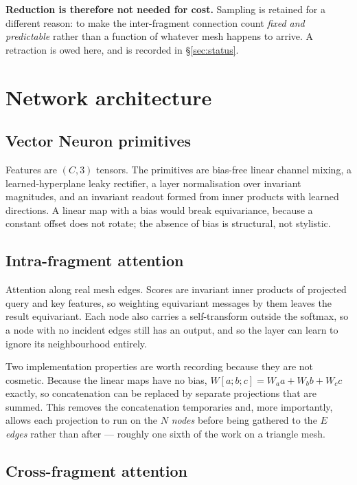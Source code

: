\documentclass[11pt,a4paper]{report}
\begin{document}
\textbf{Reduction is therefore not needed for cost.} Sampling is retained for a
different reason: to make the inter-fragment connection count \emph{fixed and
predictable} rather than a function of whatever mesh happens to arrive. A
retraction is owed here, and is recorded in \S\ref{sec:status}.

\section{Network architecture}
\label{sec:architecture}

\subsection{Vector Neuron primitives}
\label{sub:vn}

Features are $(C,3)$ tensors. The primitives are bias-free linear channel
mixing, a learned-hyperplane leaky rectifier, a layer normalisation over
invariant magnitudes, and an invariant readout formed from inner products with
learned directions. A linear map with a bias would break equivariance, because a
constant offset does not rotate; the absence of bias is structural, not
stylistic.

\subsection{Intra-fragment attention}
\label{sub:intra}

Attention along real mesh edges. Scores are invariant inner products of
projected query and key features, so weighting equivariant messages by them
leaves the result equivariant. Each node also carries a self-transform outside
the softmax, so a node with no incident edges still has an output, and so the
layer can learn to ignore its neighbourhood entirely.

Two implementation properties are worth recording because they are not
cosmetic. Because the linear maps have no bias,
$W[a;b;c] = W_a a + W_b b + W_c c$ exactly, so concatenation can be replaced by
separate projections that are summed. This removes the concatenation temporaries
and, more importantly, allows each projection to run on the $N$ \emph{nodes}
before being gathered to the $E$ \emph{edges} rather than after --- roughly one
sixth of the work on a triangle mesh.

\subsection{Cross-fragment attention}
\label{sub:cross}
\end{document}
